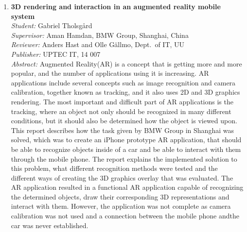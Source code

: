 \begin{small}
\begin{enumerate}
\item\textbf{3D rendering and interaction in an augmented reality mobile system}\\
  \emph{Student:} Gabriel Tholsg{\aa}rd\\
  \emph{Supervisor:} Aman Hamdan, BMW Group, Shanghai, China \\
  \emph{Reviewer:} Anders Hast and Olle G\"{a}llmo, Dept.~of IT, UU\\
  \emph{Publisher:} UPTEC IT, 14 007\\
  \emph{Abstract:} Augmented Reality(AR) is a concept that is getting more and more popular, and the number of applications using it is increasing. AR applications include several concepts such as image recognition and camera calibration, together known as tracking, and it also uses 2D and 3D graphics rendering. The most important and difficult part of AR applications is the tracking, where an object not only should be recognized in many different conditions, but it should also be determined how the object is viewed upon. This report describes how the task given by BMW Group in Shanghai was solved, which was to create an iPhone prototype AR application, that should be able to recognize objects inside of a car and be able to interact with them through the mobile phone. The report explains the implemented solution to this problem, what different recognition methods were tested and the different ways of creating the 3D graphics overlay that was evaluated. The AR application resulted in a functional AR application capable of recognizing the determined objects, draw their corresponding 3D representations and interact with them. However, the application was not complete as camera calibration was not used and a connection between the mobile phone andthe car was never established.


\end{enumerate}
\end{small}
